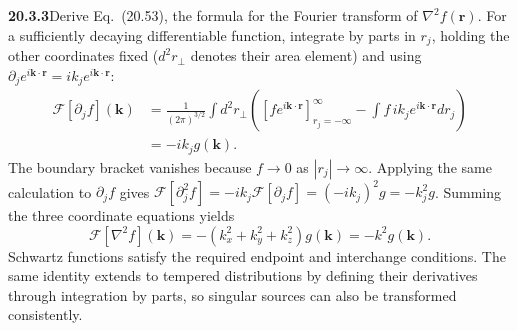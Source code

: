 \par\bigskip
\noindent\textbf{20.3.3}\quad Derive Eq.~(20.53), the formula for
the Fourier transform of $\nabla^{2}f(\mathbf{r})$.
\solution
For a sufficiently decaying differentiable function,
integrate by parts in $r_j$, holding the other coordinates fixed
($d^2r_\perp$ denotes their area element) and using
$\partial_je^{i\mathbf k\cdot\mathbf r}=ik_je^{i\mathbf k\cdot\mathbf r}$:
\begin{align*}
\mathcal F[\partial_j f](\mathbf k)
&=\frac1{(2\pi)^{3/2}}\int d^2r_\perp
\left([f e^{i\mathbf k\cdot\mathbf r}]_{r_j=-\infty}^{\infty}
-\int f\,ik_j e^{i\mathbf k\cdot\mathbf r}dr_j\right)\\
&=-ik_j g(\mathbf k).
\end{align*}
The boundary bracket vanishes because $f\to0$ as
$|r_j|\to\infty$. Applying the same calculation to
$\partial_j f$ gives
$\mathcal F[\partial_j^2 f]=-ik_j\mathcal F[\partial_jf]
=(-ik_j)^2g=-k_j^2g$.
Summing the three coordinate equations yields
\[
\boxed{\mathcal F[\nabla^2f](\mathbf k)
=-(k_x^2+k_y^2+k_z^2)g(\mathbf k)=-k^2g(\mathbf k)}.
\]
Schwartz functions satisfy the required endpoint and interchange
conditions. The same identity extends to tempered distributions
by defining their derivatives through integration by parts, so
singular sources can also be transformed consistently.

